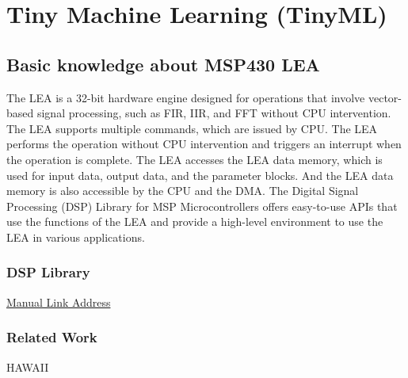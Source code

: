 \chapter{Tiny Machine Learning (TinyML)}

\section{Basic knowledge about MSP430 LEA}
The LEA is a 32-bit hardware engine designed for operations that involve vector-based signal processing, such as FIR, IIR, and FFT without CPU intervention. The LEA supports multiple commands, which are issued by CPU. The LEA performs the operation without CPU intervention and triggers an interrupt when the operation is complete. The LEA accesses the LEA data memory, which is used for input data, output data, and the parameter blocks. And the LEA data memory is also accessible by the CPU and the DMA. The Digital Signal Processing (DSP) Library for MSP Microcontrollers offers easy-to-use APIs that use the functions of the LEA and provide a high-level environment to use the LEA in various applications.

\subsection{DSP Library}

\href{http://software-dl.ti.com/msp430/msp430\_public\_sw/mcu/msp430/DSPLib/latest/exports/html/usersguide\_lea.html}{Manual Link Address} 

\subsection{Related Work}
HAWAII\cite{kang2020everything}
